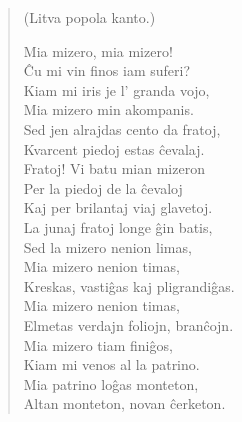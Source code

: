 \begin{verse}
\begin{center}
\footnotesize (Litva popola kanto.)
\end{center}
                     Mia mizero, mia mizero!\\
                     \^Cu mi vin finos iam suferi?\\
                     Kiam mi iris je l' granda vojo,\\
                     Mia mizero min akompanis.\\
                     Sed jen alrajdas cento da fratoj,\\
                     Kvarcent piedoj estas \^cevalaj.\\
                     Fratoj! Vi batu mian mizeron\\
                     Per la piedoj de la \^cevaloj\\
                     Kaj per brilantaj viaj glavetoj.\\
                     La junaj fratoj longe \^gin batis,\\
                     Sed la mizero nenion limas,\\
                     Mia mizero nenion timas,\\
                     Kreskas, vasti\^gas kaj pligrandi\^gas.\\
                     Mia mizero nenion timas,\\
                     Elmetas verdajn foliojn, bran\^cojn.\\
                     Mia mizero tiam fini\^gos,\\
                     Kiam mi venos al la patrino.\\
                     Mia patrino lo\^gas monteton,\\
                     Altan monteton, novan \^cerketon.

\end{verse}


\smallrule{}